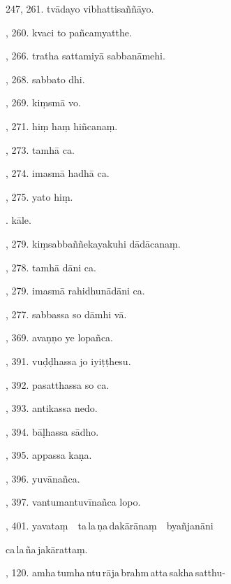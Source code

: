 247, 261. tvādayo vibhattisaññāyo.\hfill \pageref{sut:247}\par {}, 260. kvaci to pañcamyatthe.\hfill \pageref{sut:248}\par {}, 266. tratha sattamiyā sabbanāmehi.\hfill \pageref{sut:249}\par {}, 268. sabbato dhi.\hfill \pageref{sut:250}\par {}, 269. kiṃsmā vo.\hfill \pageref{sut:251}\par {}, 271. hiṃ haṃ hiñcanaṃ.\hfill \pageref{sut:252}\par {}, 273. tamhā ca.\hfill \pageref{sut:253}\par {}, 274. imasmā hadhā ca.\hfill \pageref{sut:254}\par {}, 275. yato hiṃ.\hfill \pageref{sut:255}\par {}. kāle.\hfill \pageref{sut:256}\par {}, 279. kiṃsabbaññekayakuhi dādācanaṃ.\hfill \pageref{sut:257}\par {}, 278. tamhā dāni ca.\hfill \pageref{sut:258}\par {}, 279. imasmā rahidhunādāni ca.\hfill \pageref{sut:259}\par {}, 277. sabbassa so dāmhi vā.\hfill \pageref{sut:260}\par {}, 369. avaṇṇo ye lopañca.\hfill \pageref{sut:261}\par {}, 391. vuḍḍhassa jo iyiṭṭhesu.\hfill \pageref{sut:262}\par {}, 392. pasatthassa so ca.\hfill \pageref{sut:263}\par {}, 393. antikassa nedo.\hfill \pageref{sut:264}\par {}, 394. bāḷhassa sādho.\hfill \pageref{sut:265}\par {}, 395. appassa kaṇa.\hfill \pageref{sut:266}\par {}, 396. yuvānañca.\hfill \pageref{sut:267}\par {}, 397. vantumantuvīnañca lopo.\hfill \pageref{sut:268}\par {}, 401. yavataṃ\ \ ta\,la\,ṇa\,dakārānaṃ\ \ byañjanāni\par \noindent
\hspace{15mm} ca\,la\,ña\,jakārattaṃ.\hfill \pageref{sut:269}\par {}, 120. amha\,tumha\,ntu\,rāja\,brahm\,atta\,sakha\,satthu-\par \noindent
